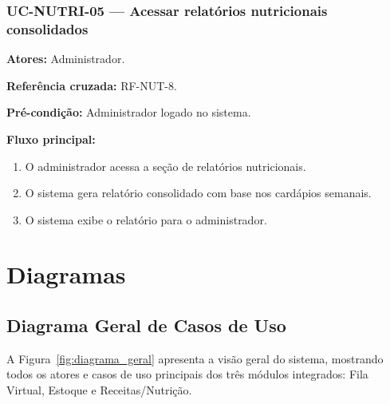 \documentclass[12pt,a4paper]{article}
\begin{document}
\subsubsection{UC-NUTRI-05 — Acessar relatórios nutricionais consolidados}
\textbf{Atores:} Administrador.  

\textbf{Referência cruzada:} RF-NUT-8.  

\textbf{Pré-condição:} Administrador logado no sistema.  

\textbf{Fluxo principal:}
\begin{enumerate}
    \item O administrador acessa a seção de relatórios nutricionais.
    \item O sistema gera relatório consolidado com base nos cardápios semanais.
    \item O sistema exibe o relatório para o administrador.
\end{enumerate}


\section{Diagramas}

\subsection{Diagrama Geral de Casos de Uso}

A Figura~\ref{fig:diagrama_geral} apresenta a visão geral do sistema, mostrando todos os atores e casos de uso principais dos três módulos integrados: Fila Virtual, Estoque e Receitas/Nutrição.
\end{document}
